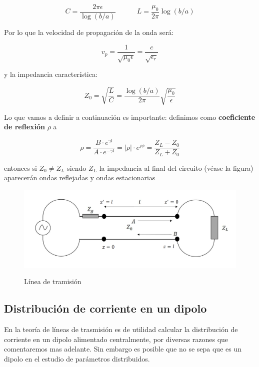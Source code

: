 \documentclass[12pt,a4paper]{article}
\newcommand{\tquad}{\quad \quad \quad}
\begin{document}
\begin{equation}
C = \dfrac{2 \pi \epsilon}{\log (b/a)} \tquad L = \dfrac{\mu_0}{2 \pi} \log (b/a)
\end{equation}

Por lo que la velocidad de propagación de la onda será:

\begin{equation}
v_p = \dfrac{1}{\sqrt{\mu_0 \epsilon}} = \dfrac{c}{\sqrt{\epsilon_r}}
\end{equation}

y la impedancia característica:

\begin{equation}
Z_0 = \sqrt{\frac{L}{C}} = \dfrac{\log(b/a)}{2 \pi } \sqrt{\frac{\mu_0}{\epsilon}}
\end{equation}

Lo que vamos a definir a continuación es importante: definimos como \textbf{coeficiente de reflexión} $\rho$ a

\begin{equation}
\rho = \dfrac{B \cdot e^{\gamma l}}{A \cdot e^{-\gamma l}} = |\rho| \cdot e^{j \phi} = \dfrac{Z_L - Z_0}{Z_L + Z_0}
\end{equation}
 
entonces si $Z_0 \neq Z_L$ siendo $Z_L$ la impedancia al final del circuito (véase la figura) aparecerán ondas reflejadas y ondas estacionarias
 

\begin{figure}[h!] \centering
\includegraphics[scale=0.5]{lineatrasmision3.png} \label{Fig:8.2-004}
\caption{Línea de tramisión}
\end{figure}

 
\subsection{Distribución de corriente en un dipolo}

En la teoría de líneas de trasmisión es de utilidad calcular la distribución de corriente en un dipolo alimentado centralmente, por diversas razones que comentaremos mas adelante. Sin embargo es posible que no se sepa que es un dipolo en el estudio de parámetros distribuidos. \\
\end{document}
